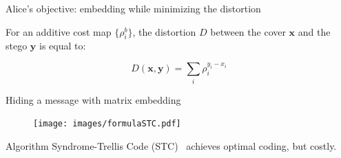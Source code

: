 \documentclass[10pt,aspectratio=169]{beamer}
\renewcommand{\vec}[1]{\mathbf{#1}}
\begin{document}
\begin{frame}{Alice's objective: embedding while minimizing the distortion}

\begin{tcolorbox}[colback=lightgreen,colframe=greentheme,title=\textbf{Definition} (Distortion)]
For an additive cost map $\{\rho_i^b\}$, the  distortion $D$ between the cover $\vec{x}$ and the stego $\vec{y}$ is equal to:

\begin{equation}
D(\mathbf{x},\mathbf{y}) = \sum_i \rho_i^{y_i - x_i}
\end{equation}

\end{tcolorbox}
\end{frame}




\begin{frame}{Hiding a message with matrix embedding}
\begin{figure}[h]
\texttt{[image: images/formulaSTC.pdf]}
\end{figure}
\pause
Algorithm Syndrome-Trellis Code (STC)~ achieves optimal coding, but costly.
\end{frame}






\end{document}
